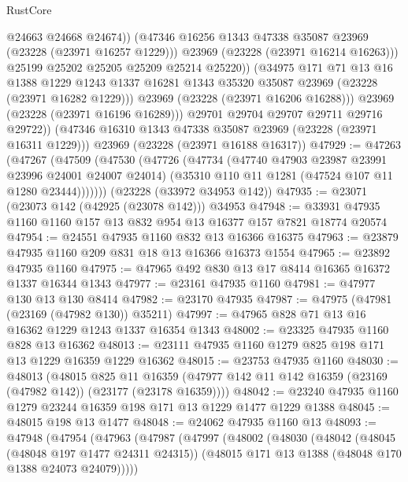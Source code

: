 \begin{lexlean}{RustCore}
\begin{coremodule}
                      @24663
                      @24668
                      @24674))
                  (@47346 @16256 @1343 @47338 @35087 @23969 (@23228 (@23971 @16257 @1229)))
                  @23969
                  (@23228 (@23971 @16214 @16263)))
                @25199
                @25202
                @25205
                @25209
                @25214
                @25220))
            (@34975
              @171
              @71
              @13
              @16
              @1388
              @1229
              @1243
              @1337
              @16281
              @1343
              @35320
              @35087
              @23969
              (@23228 (@23971 @16282 @1229)))
            @23969
            (@23228 (@23971 @16206 @16288)))
          @23969
          (@23228 (@23971 @16196 @16289)))
        @29701
        @29704
        @29707
        @29711
        @29716
        @29722))
    (@47346 @16310 @1343 @47338 @35087 @23969 (@23228 (@23971 @16311 @1229)))
    @23969
    (@23228 (@23971 @16188 @16317))
@47929 := @47263
    (@47267
      (@47509
        (@47530
          (@47726
            (@47734
              (@47740 @47903 @23987 @23991 @23996 @24001 @24007 @24014)
              (@35310 @110 @11 @1281 (@47524 @107 @11 @1280 @23444)))))))
    (@23228 (@33972 @34953 @142))
@47935 := @23071 (@23073 @142 (@42925 (@23078 @142))) @34953
@47948 := @33931 @47935 @1160 @1160 @157 @13 @832 @954 @13 @16377 @157 @7821 @18774 @20574
@47954 := @24551 @47935 @1160 @832 @13 @16366 @16375
@47963 := @23879 @47935 @1160 @209 @831 @18 @13 @16366 @16373 @1554
@47965 := @23892 @47935 @1160
@47975 := @47965 @492 @830 @13 @17 @8414 @16365 @16372 @1337 @16344 @1343
@47977 := @23161 @47935 @1160
@47981 := @47977 @130 @13 @130 @8414
@47982 := @23170 @47935
@47987 := @47975 (@47981 (@23169 (@47982 @130)) @35211)
@47997 := @47965 @828 @71 @13 @16 @16362 @1229 @1243 @1337 @16354 @1343
@48002 := @23325 @47935 @1160 @828 @13 @16362
@48013 := @23111 @47935 @1160 @1279 @825 @198 @171 @13 @1229 @16359 @1229 @16362
@48015 := @23753 @47935 @1160
@48030 := @48013
    (@48015
      @825
      @11
      @16359
      (@47977 @142 @11 @142 @16359 (@23169 (@47982 @142)) (@23177 (@23178 @16359))))
@48042 := @23240 @47935 @1160 @1279 @23244 @16359 @198 @171 @13 @1229 @1477 @1229 @1388
@48045 := @48015 @198 @13 @1477
@48048 := @24062 @47935 @1160 @13
@48093 := @47948
    (@47954
      (@47963
        (@47987
          (@47997
            (@48002
              (@48030
                (@48042
                  (@48045 (@48048 @197 @1477 @24311 @24315))
                  (@48015 @171 @13 @1388 (@48048 @170 @1388 @24073 @24079)))))

\end{coremodule}
\end{lexlean}
